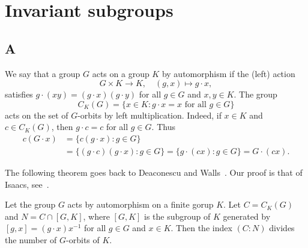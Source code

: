 \chapter{Invariant subgroups}

\section*{A}

We say that a group $G$ acts on a group $K$ by automorphism if the (left) action
\[
G\times K\to K,
\quad
(g,x)\mapsto g\cdot x,
\]
satisfies $g\cdot (xy)=(g\cdot x)(g\cdot y)$ 
for all $g\in G$ and $x,y\in K$. 
The group 
\[
C_{K}(G)=\{x\in K:g\cdot x=x\text{ for all }g\in G\}
\]
acts on the 
set of $G$-orbits by left multiplication. Indeed, if $x\in K$ and $c\in C_K(G)$, then $g\cdot c=c$ for all $g\in G$. Thus  
\begin{align*}
  c(G\cdot x)
  &=\{c(g\cdot x):g\in G\}\\
  &=\{(g\cdot c)(g\cdot x):g\in G\}
  =\{g\cdot (cx):g\in G\}
  =G\cdot (cx).
\end{align*}

The following theorem goes back to Deaconescu and Walls~\cite{MR2164558}. 
Our proof is that of Isaacs, see~\cite{MR2922681}. 

\begin{theorem}
	\label{thm:DeaconescuWalls}
	Let the group $G$ acts by automorphism on a finite gorup $K$. Let
	$C=C_{K}(G)$ and $N=C\cap [G,K]$,
	where $[G,K]$ is the subgroup of $K$ generated by $[g,x]=(g\cdot x)x^{-1}$ for all
	$g\in G$ and $x\in K$. Then the index $(C:N)$ divides the number of $G$-orbits of 
	$K$. 
\end{theorem}

%

